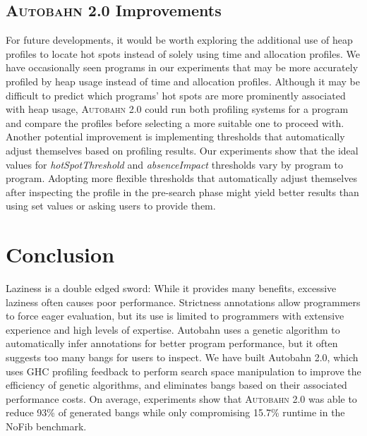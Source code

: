 \documentclass[format=sigplan, review=true]{acmart}
\newcommand{\hotspots}[0]{hot spots}
\newcommand{\hotspotcost}[0]{\textit{hotSpotThreshold}}
\newcommand{\At}[0]{\textsc{Autobahn 2.0}}
\newcommand{\preopt}[0]{pre-search}
\newcommand{\absim}[0]{\textit{absenceImpact}}
\begin{document}
\subsection{\At{} Improvements}
For future developments, it would be worth exploring the additional use of heap profiles to locate hot spots instead of solely using time and allocation profiles. We have occasionally seen programs in our experiments that may be more accurately profiled by heap usage instead of time and allocation profiles. Although it may be difficult to predict which programs' \hotspots{} are more prominently associated with heap usage, \At{} could run both profiling systems for a program and compare the profiles before selecting a more suitable one to proceed with. Another potential improvement is implementing thresholds that automatically adjust themselves based on profiling results. Our experiments show that the ideal values for \hotspotcost{} and \absim{} thresholds vary by program to program. Adopting more flexible thresholds that automatically adjust themselves after inspecting the profile in the \preopt{} phase might yield better results than using set values or asking users to provide them.


\section{Conclusion}

Laziness is a double edged sword: While it provides many benefits,
excessive laziness often causes poor performance. Strictness
annotations allow programmers to force eager evaluation, but its use
is limited to programmers with extensive experience and high levels of
expertise. Autobahn uses a genetic algorithm to automatically infer
annotations for better program performance, but it often suggests too
many bangs for users to inspect. We have built Autobahn 2.0, which
uses GHC profiling feedback to perform search space manipulation to
improve the efficiency of genetic algorithms, and eliminates bangs
based on their associated performance costs. On average, experiments
show that \At{} was able to reduce 93\% of generated bangs while
only compromising 15.7\% runtime in the NoFib benchmark.



\end{document}
